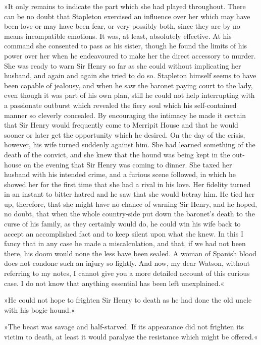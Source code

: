 »It only remains to indicate the part which she had played throughout. There can be no doubt that Stapleton exercised an influence over her which may have been love or may have been fear, or very possibly both, since they are by no means incompatible emotions. It was, at least, absolutely effective. At his command she consented to pass as his sister, though he found the limits of his power over her when he endeavoured to make her the direct accessory to murder. She was ready to warn Sir Henry so far as she could without implicating her husband, and again and again she tried to do so. Stapleton himself seems to have been capable of jealousy, and when he saw the baronet paying court to the lady, even though it was part of his own plan, still he could not help interrupting with a passionate outburst which revealed the fiery soul which his self-contained manner so cleverly concealed. By encouraging the intimacy he made it certain that Sir Henry would frequently come to Merripit House and that he would sooner or later get the opportunity which he desired. On the day of the crisis, however, his wife turned suddenly against him. She had learned something of the death of the convict, and she knew that the hound was being kept in the out-house on the evening that Sir Henry was coming to dinner. She taxed her husband with his intended crime, and a furious scene followed, in which he showed her for the first time that she had a rival in his love. Her fidelity turned in an instant to bitter hatred and he saw that she would betray him. He tied her up, therefore, that she might have no chance of warning Sir Henry, and he hoped, no doubt, that when the whole country-side put down the baronet's death to the curse of his family, as they certainly would do, he could win his wife back to accept an accomplished fact and to keep silent upon what she knew. In this I fancy that in any case he made a miscalculation, and that, if we had not been there, his doom would none the less have been sealed. A woman of Spanish blood does not condone such an injury so lightly. And now, my dear Watson, without referring to my notes, I cannot give you a more detailed account of this curious case. I do not know that anything essential has been left unexplained.«

»He could not hope to frighten Sir Henry to death as he had done the old uncle with his bogie hound.«

»The beast was savage and half-starved. If its appearance did not frighten its victim to death, at least it would paralyse the resistance which might be offered.«

